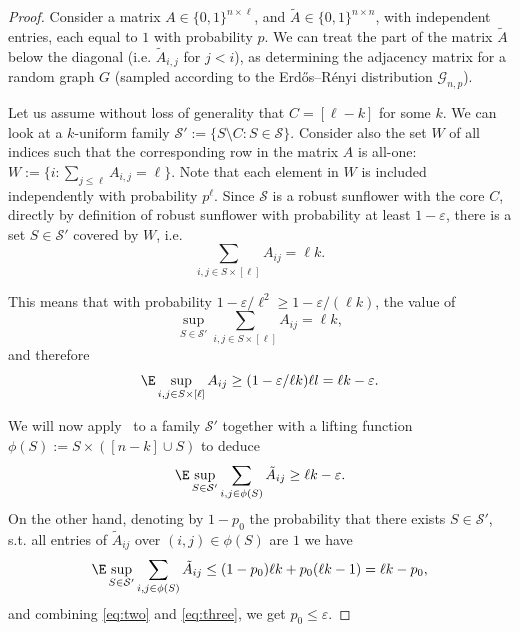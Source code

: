 \begin{proof}
Consider a matrix $A \in \{0, 1\}^{n \times \ell}$, and $\tilde{A} \in \{0, 1\}^{n \times n}$, with independent entries, each equal to $1$ with probability $p$. We can treat the part of the matrix $\tilde{A}$  below the diagonal (i.e. $\tilde{A}_{i,j}$ for $j < i$), as determining the adjacency matrix for a random graph $G$ (sampled according to the Erdős–Rényi distribution $\mathcal{G}_{n,p}$).

Let us assume without loss of generality that $C = [\ell-k]$ for some $k$. We can look at a $k$-uniform family $\mathcal{S}' := \{S \setminus C : S \in \mathcal{S}\}$. Consider also the set $W$ of all indices such that the corresponding row in the matrix $A$ is all-one: $W := \{i : \sum_{j\leq \ell} A_{i,j} = \ell \}$. Note that each element in $W$ is included independently with probability $p^\ell$. Since $\mathcal{S}$ is a robust sunflower with the core $C$, directly by definition of robust sunflower with probability at least $1-\varepsilon$, there is a set $S \in \mathcal{S}'$ covered by $W$, i.e. 
\begin{equation*}
    \sum_{i,j \in S \times [\ell]} A_{ij} = \ell k.
\end{equation*}

This means that with probability $1-\varepsilon/\ell^2 \geq 1-\varepsilon/(\ell k)$, the value of
\begin{equation*}
    \sup_{S \in \mathcal{S}'} \sum_{i,j \in S \times [\ell]} A_{ij} = \ell k,
\end{equation*}
and therefore
\begin{equation*}
    \E \sup_{i,j \in S \times [\ell]} A_{ij}\geq (1-\varepsilon/\ell k)\ell l = \ell k - \varepsilon.
\end{equation*}

We will now apply~
 to a family $\mathcal{S}'$ together with a lifting function $\phi(S) := S \times ([n-k] \cup S)$ to deduce
\begin{equation}
\label{eq:two}
    \E \sup_{S \in \mathcal{S'}} \sum_{i,j \in \phi(S)} \tilde{A}_{ij}\geq  \ell k - \varepsilon.
\end{equation}
On the other hand, denoting by $1 - p_0$ the probability that there exists $S \in \mathcal{S'}$, s.t. all entries of $\tilde{A}_{ij}$ over $(i,j) \in \phi(S)$ are $1$ we have
\begin{equation}
\label{eq:three}
 \E \sup_{S \in \mathcal{S'}} \sum_{i,j \in \phi(S)} \tilde{A}_{ij} \leq (1 - p_0) \ell k + p_0 (\ell k - 1) = \ell k - p_0,    
\end{equation}
and combining \eqref{eq:two} and \eqref{eq:three}, we get $p_0 \leq \varepsilon$.


\end{proof}
